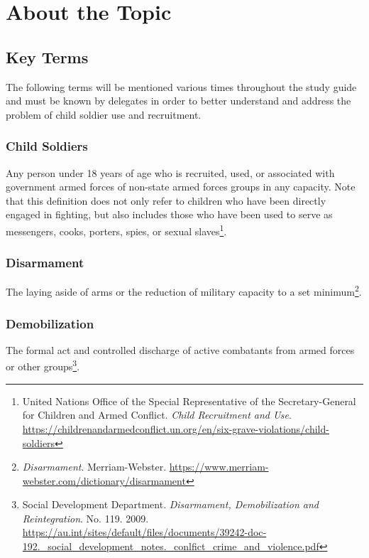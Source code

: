 \section{About the Topic}

\subsection{Key Terms}

The following terms will be mentioned various times throughout the study guide and must be known by delegates in order to better understand and address the problem of child soldier use and recruitment.

\subsubsection{Child Soldiers}

Any person under 18 years of age who is recruited, used, or associated with government armed forces of non-state armed forces groups in any capacity. Note that this definition does not only refer to children who have been directly engaged in fighting, but also includes those who have been used to serve as messengers, cooks, porters, spies, or sexual slaves\footnote{United Nations Office of the Special Representative of the Secretary-General for Children and Armed Conflict. \emph{Child Recruitment and Use}. \url{https://childrenandarmedconflict.un.org/en/six-grave-violations/child-soldiers}}.

\subsubsection{Disarmament}

The laying aside of arms or the reduction of military capacity to a set minimum\footnote{\emph{Disarmament}. Merriam-Webster. \url{https://www.merriam-webster.com/dictionary/disarmament}}.

\subsubsection{Demobilization}

The formal act and controlled discharge of active combatants from armed forces or other groups\footnote{Social Development Department. \emph{Disarmament, Demobilization and Reintegration}. No. 119. 2009. \url{https://au.int/sites/default/files/documents/39242-doc-192._social_development_notes._conlfict_crime_and_violence.pdf}}.

